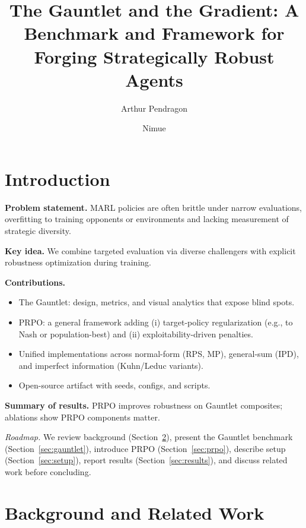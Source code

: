 \documentclass[sigconf,anonymous]{aamas}
\title[The Gauntlet and the Gradient]{The Gauntlet and the Gradient: A Benchmark and Framework for Forging Strategically Robust Agents}
\author{Arthur Pendragon}
\affiliation{
  \institution{Camelot Castle}
  \city{Camelot}
  \country{United Kingdom}}
\author{Nimue}
\affiliation{
  \institution{The Lady's Lake}
  \city{Avalon}
  \country{United Kingdom}}
\begin{document}

\pagestyle{fancy}
\fancyhead{}


\maketitle 

\section{Introduction}

\textbf{Problem statement.} MARL policies are often brittle under narrow evaluations, overfitting to training opponents or environments and lacking measurement of strategic diversity.

\textbf{Key idea.} We combine targeted evaluation via diverse challengers with explicit robustness optimization during training.

\textbf{Contributions.}
\begin{itemize}
\item The Gauntlet: design, metrics, and visual analytics that expose blind spots.
\item PRPO: a general framework adding (i) target-policy regularization (e.g., to Nash or population-best) and (ii) exploitability-driven penalties.
\item Unified implementations across normal-form (RPS, MP), general-sum (IPD), and imperfect information (Kuhn/Leduc variants).
\item Open-source artifact with seeds, configs, and scripts.
\end{itemize}

\textbf{Summary of results.} PRPO improves robustness on Gauntlet composites; ablations show PRPO components matter.

\medskip
\noindent\textit{Roadmap.} We review background (Section~\ref{sec:background}), present the Gauntlet benchmark (Section~\ref{sec:gauntlet}), introduce PRPO (Section~\ref{sec:prpo}), describe setup (Section~\ref{sec:setup}), report results (Section~\ref{sec:results}), and discuss related work before concluding.


\section{Background and Related Work}
\label{sec:background}
\end{document}
